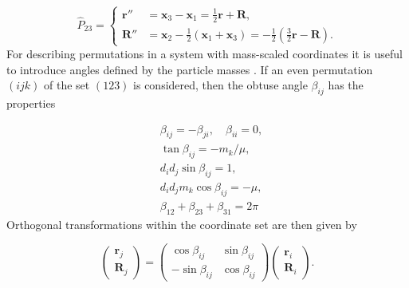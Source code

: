 \documentclass{article}
\numberwithin{equation}{section}
\begin{document}
\begin{equation}
\hat{P}_{23} = \left \{ \begin{aligned}
\mathbf{r}'' &= \mathbf{x}_3 - \mathbf{x}_1 = \frac{1}{2}\mathbf{r} + \mathbf{R}, \\
\mathbf{R}'' &= \mathbf{x}_2 - \frac{1}{2}(\mathbf{x}_1 + \mathbf{x}_3) = -\frac{1}{2} (\frac{3}{2} \mathbf{r} - \mathbf{R}).
\end{aligned}
\right.
\end{equation}
For describing permutations in a system with mass-scaled coordinates it is useful to introduce angles defined by the particle masses \cite{Smith1962}\cite{Johnson1980}. If an even permutation $(ijk)$ of the set $(123)$ is considered, then the obtuse angle $\beta_{ij}$ has the properties

\begin{subequations}
	\begin{align}
	&\beta_{ij} = -\beta_{ji}, \quad \beta_{ii} = 0,\\
	&\tan\beta_{ij} = -m_k/\mu,\\
	&d_{i}d_{j} \sin\beta_{ij} = 1,\\
	&d_{i}d_{j} m_{k} \cos\beta_{ij} = -\mu,\\
	&\beta_{12}+\beta_{23}+\beta_{31} = 2\pi
	\end{align}
\end{subequations}
Orthogonal transformations within the coordinate set are then given by 

\begin{equation}
\begin{pmatrix}
\mathbf{r}_j\\
\mathbf{R}_j
\end{pmatrix}
=
\begin{pmatrix}
\cos\beta_{ij} & \sin\beta_{ij}\\
-\sin\beta_{ij} & \cos\beta_{ij}
\end{pmatrix}
\begin{pmatrix}
\mathbf{r}_i\\
\mathbf{R}_i
\end{pmatrix}.
\end{equation}   
\end{document}
